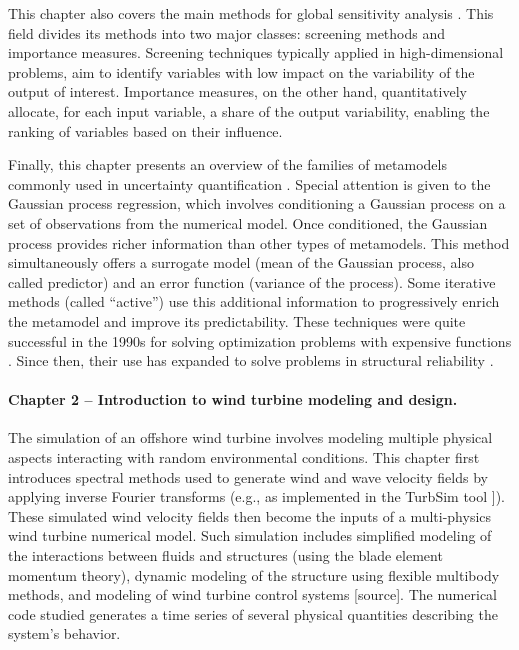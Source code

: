 This chapter also covers the main methods for global sensitivity analysis \citep{daveiga_iooss_2021}. 
This field divides its methods into two major classes: screening methods and importance measures. 
Screening techniques typically applied in high-dimensional problems, aim to identify variables with low impact on the variability of the output of interest. 
Importance measures, on the other hand, quantitatively allocate, for each input variable, a share of the output variability, enabling the ranking of variables based on their influence.

Finally, this chapter presents an overview of the families of metamodels commonly used in uncertainty quantification \citep{forrester_2008}. 
Special attention is given to the Gaussian process regression, which involves conditioning a Gaussian process on a set of observations from the numerical model. 
Once conditioned, the Gaussian process provides richer information than other types of metamodels. 
This method simultaneously offers a surrogate model (mean of the Gaussian process, also called predictor) and an error function (variance of the process). 
Some iterative methods (called ``active'') use this additional information to progressively enrich the metamodel and improve its predictability. 
These techniques were quite successful in the 1990s for solving optimization problems with expensive functions \citep{jones_1998}. 
Since then, their use has expanded to solve problems in structural reliability \cite{echard_2011}.


\paragraph{Chapter 2 -- Introduction to wind turbine modeling and design.} 
The simulation of an offshore wind turbine involves modeling multiple physical aspects interacting with random environmental conditions. 
This chapter first introduces spectral methods used to generate wind and wave velocity fields by applying inverse Fourier transforms (e.g., as implemented in the TurbSim tool \citep{turbsim_2009}]). 
These simulated wind velocity fields then become the inputs of a multi-physics wind turbine numerical model. 
Such simulation includes simplified modeling of the interactions between fluids and structures (using the blade element momentum theory), dynamic modeling of the structure using flexible multibody methods, and modeling of wind turbine control systems [source]. 
The numerical code studied generates a time series of several physical quantities describing the system's behavior.


